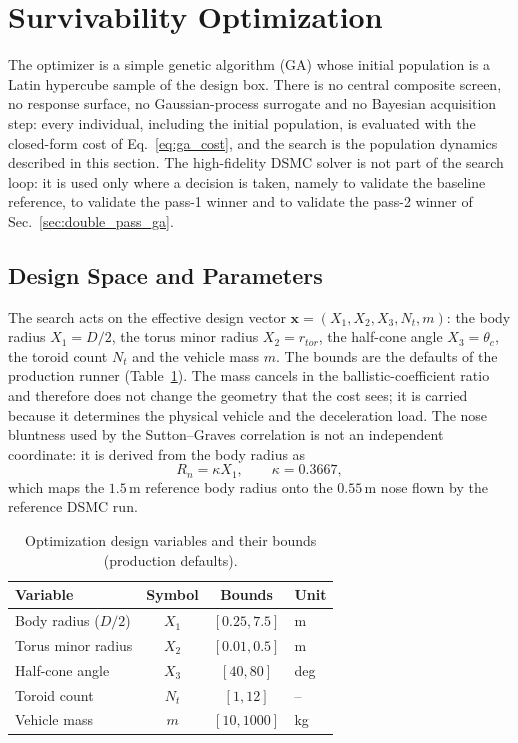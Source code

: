 \section{Survivability Optimization}
\label{sec:ga_opt}

The optimizer is a simple genetic algorithm (GA) whose initial population is a Latin hypercube sample of the design box. There is no central composite screen, no response surface, no Gaussian-process surrogate and no Bayesian acquisition step: every individual, including the initial population, is evaluated with the closed-form cost of Eq.~\eqref{eq:ga_cost}, and the search is the population dynamics described in this section. The high-fidelity DSMC solver is not part of the search loop: it is used only where a decision is taken, namely to validate the baseline reference, to validate the pass-1 winner and to validate the pass-2 winner of Sec.~\ref{sec:double_pass_ga}.

\subsection{Design Space and Parameters}
The search acts on the effective design vector $\mathbf{x}=(X_1,X_2,X_3,N_t,m)$: the body radius $X_1=D/2$, the torus minor radius $X_2=r_{tor}$, the half-cone angle $X_3=\theta_c$, the toroid count $N_t$ and the vehicle mass $m$. The bounds are the defaults of the production runner (Table~\ref{tab:design_variables}). The mass cancels in the ballistic-coefficient ratio and therefore does not change the geometry that the cost sees; it is carried because it determines the physical vehicle and the deceleration load. The nose bluntness used by the Sutton--Graves correlation is not an independent coordinate: it is derived from the body radius as
\begin{equation}
    R_n = \kappa X_1, \qquad \kappa = 0.3667,
    \label{eq:nose_ratio}
\end{equation}
which maps the $1.5$\,m reference body radius onto the $0.55$\,m nose flown by the reference DSMC run.

\begin{table}[H]
    \centering
    \caption{Optimization design variables and their bounds (production defaults).}
    \label{tab:design_variables}
    \begin{tabularx}{\textwidth}{|>{\RaggedRight\arraybackslash}p{}|c|c|X|}
        \hline
        \textbf{Variable} & \textbf{Symbol} & \textbf{Bounds} & \textbf{Unit} \\ \hline
        Body radius ($D/2$) & $X_1$ & $[0.25, 7.5]$ & m \\ \hline
        Torus minor radius & $X_2$ & $[0.01, 0.5]$ & m \\ \hline
        Half-cone angle & $X_3$ & $[40, 80]$ & deg \\ \hline
        Toroid count & $N_t$ & $[1, 12]$ & -- \\ \hline
        Vehicle mass & $m$ & $[10, 1000]$ & kg \\ \hline
    \end{tabularx}
\end{table}

